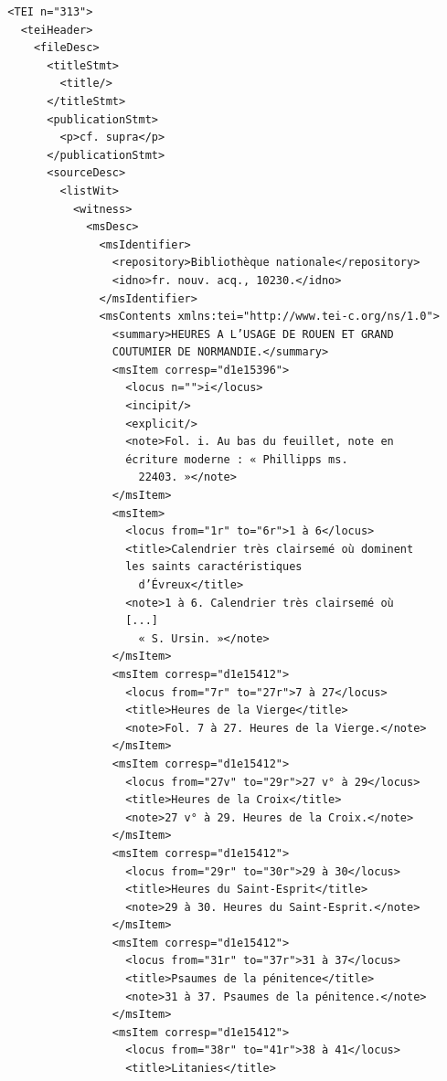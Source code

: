 \documentclass[a4paper,12pt,twoside]{book}
\begin{document}
	\begin{verbatim}
  <TEI n="313">
    <teiHeader>
      <fileDesc>
        <titleStmt>
          <title/>
        </titleStmt>
        <publicationStmt>
          <p>cf. supra</p>
        </publicationStmt>
        <sourceDesc>
          <listWit>
            <witness>
              <msDesc>
                <msIdentifier>
                  <repository>Bibliothèque nationale</repository>
                  <idno>fr. nouv. acq., 10230.</idno>
                </msIdentifier>
                <msContents xmlns:tei="http://www.tei-c.org/ns/1.0">
                  <summary>HEURES A L’USAGE DE ROUEN ET GRAND 
                  COUTUMIER DE NORMANDIE.</summary>
                  <msItem corresp="d1e15396">
                    <locus n="">i</locus>
                    <incipit/>
                    <explicit/>
                    <note>Fol. i. Au bas du feuillet, note en 
                    écriture moderne : « Phillipps ms.
                      22403. »</note>
                  </msItem>
                  <msItem>
                    <locus from="1r" to="6r">1 à 6</locus>
                    <title>Calendrier très clairsemé où dominent 
                    les saints caractéristiques
                      d’Évreux</title>
                    <note>1 à 6. Calendrier très clairsemé où 
                    [...]
                      « S. Ursin. »</note>
                  </msItem>
                  <msItem corresp="d1e15412">
                    <locus from="7r" to="27r">7 à 27</locus>
                    <title>Heures de la Vierge</title>
                    <note>Fol. 7 à 27. Heures de la Vierge.</note>
                  </msItem>
                  <msItem corresp="d1e15412">
                    <locus from="27v" to="29r">27 v° à 29</locus>
                    <title>Heures de la Croix</title>
                    <note>27 v° à 29. Heures de la Croix.</note>
                  </msItem>
                  <msItem corresp="d1e15412">
                    <locus from="29r" to="30r">29 à 30</locus>
                    <title>Heures du Saint-Esprit</title>
                    <note>29 à 30. Heures du Saint-Esprit.</note>
                  </msItem>
                  <msItem corresp="d1e15412">
                    <locus from="31r" to="37r">31 à 37</locus>
                    <title>Psaumes de la pénitence</title>
                    <note>31 à 37. Psaumes de la pénitence.</note>
                  </msItem>
                  <msItem corresp="d1e15412">
                    <locus from="38r" to="41r">38 à 41</locus>
                    <title>Litanies</title>

\end{verbatim}
\end{document}
